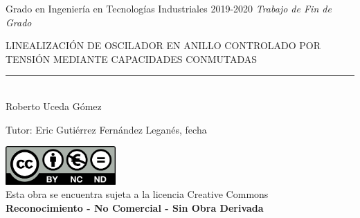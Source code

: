 \documentclass[12pt]{report} %
\begin{document}

\begin{titlepage}

	\begin{sffamily}
	\color{azulUC3M}
	\begin{center}
		\begin{figure}[H] %
		\end{figure}
		\vspace{2.5cm}
		\begin{Large}
			Grado en Ingeniería en Tecnologías Industriales		
			2019-2020
			\vspace{2cm}		
			\textsl{Trabajo de Fin de Grado}
			\bigskip
			
		\end{Large}
		 	{\Huge LINEALIZACIÓN DE OSCILADOR EN ANILLO CONTROLADO POR TENSIÓN MEDIANTE CAPACIDADES CONMUTADAS}\\
		 	\vspace*{0.5cm}
	 		\rule{10.5cm}{0.1mm}\\
			\vspace*{0.9cm}
			{\LARGE Roberto Uceda Gómez}\\ 
			\vspace*{1cm}
		\begin{Large}
			Tutor:
			Eric Gutiérrez Fernández
			Leganés, {fecha}
		\end{Large}
	\end{center}
	\vfill
	\color{black}
	\includegraphics[width=4.2cm]{res/creativecommons.png}\\ %
	Esta obra se encuentra sujeta a la licencia Creative Commons\\ \textbf{Reconocimiento - No Comercial - Sin Obra Derivada}
	\end{sffamily}
\end{titlepage}
\end{document}
